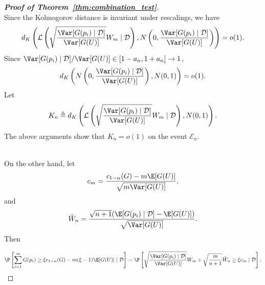 \begin{proof}[\textbf{Proof of Theorem~\ref{thm:combination_test}}]
\begin{equation*}
\end{equation*}
Since the Kolmogorov distance is invariant under rescalings, we have
\[d_{K}\left(\mathcal{L}\left(\sqrt{\frac{\Var[G(p_i)\mid \mathcal{D}]}{\Var[G(U)]}} W_{m}\mid \mathcal{D}\right), N\left(0, \frac{\Var[G(p_i)\mid \mathcal{D}]}{\Var[G(U)]}\right)\right) = o(1).\]
Since $\Var[G(p_i)\mid \mathcal{D}]/\Var[G(U)]\in [1 - a_{n}, 1 + a_{n}]\rightarrow 1$,
\[d_{K}\left( N\left(0, \frac{\Var[G(p_i)\mid \mathcal{D}]}{\Var[G(U)]}\right), N(0, 1)\right) = o(1).\]
Let
\begin{equation}\label{eq:conditional_CLT}
  K_{n}\triangleq d_{K}\left(\mathcal{L}\left(\sqrt{\frac{\Var[G(p_i)\mid \mathcal{D}]}{\Var[G(U)]}} W_{m}\mid \mathcal{D}\right), N(0, 1)\right).
\end{equation}
The above arguments show that $K_{n} = o(1)$ on the event $\mathcal{E}_{n}$.

~\\
\noindent On the other hand, let
\begin{equation*}
   c_{m} = \frac{c_{1 - \alpha}(G) - m\E[G(U)]}{\sqrt{m\Var[G(U)]}},
\end{equation*}
and
\begin{equation*}
\tilde{W}_{n} = \frac{\sqrt{n + 1}(\E[G(p_i)\mid \mathcal{D}] - \E[G(U)])}{\sqrt{\Var[G(U)]}}.
\end{equation*}
Then

\begin{align*}
\P\left[\sum_{i=1}^{m}G(p_i)\ge \xi c_{1 - \alpha}(G) - m(\xi - 1)\E[G(U)]\mid \mathcal{D}\right] = \P\left[\sqrt{\frac{\Var[G(p_i)\mid \mathcal{D}]}{\Var[G(U)]}}W_{m} + \sqrt{\frac{m}{n + 1}}\tilde{W}_{n}\ge \xi c_{m}\mid \mathcal{D}\right].
\end{align*}


\end{proof}
